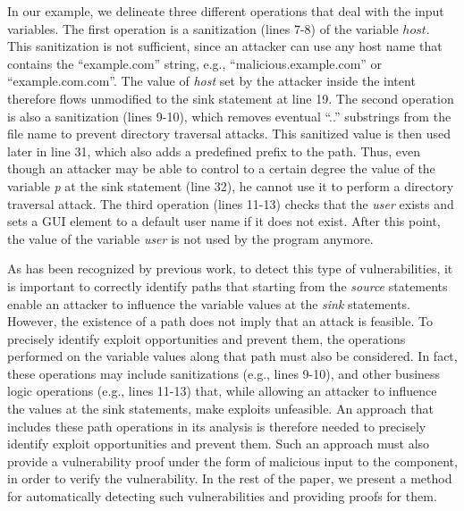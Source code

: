 In our example, we delineate three different operations that deal with the input variables. The first operation is a sanitization (lines 7-8) of the variable $host$. This sanitization is not sufficient, since an attacker can use any host name that contains the ``example.com'' string, e.g., ``malicious.example.com'' or ``example.com.com''. The value of \textit{host} set by the attacker inside the intent therefore flows unmodified to the sink statement at line 19. The second operation is also a sanitization (lines 9-10), which removes eventual ``..'' substrings from the file name to prevent directory traversal attacks. This sanitized value is then used later in line 31, which also adds a predefined prefix to the path. Thus, even though an attacker may be able to control to a certain degree the value of the variable \textit{p} at the sink statement (line 32), he cannot use it to perform a directory traversal attack. The third operation (lines 11-13) checks that the \textit{user} exists and sets a GUI element to a default user name if it does not exist. After this point, the value of the variable \textit{user} is not used by the program anymore. 

As has been recognized by previous work, to detect this type of vulnerabilities, it is important to correctly identify paths that starting from the \textit{source} statements enable an attacker to influence the variable values at the \textit{sink} statements. However, the existence of a path does not imply that an attack is feasible. To precisely identify exploit opportunities and prevent them, the operations performed on the variable values along that path must also be considered. In fact, these operations may include  sanitizations (e.g., lines 9-10), and other business logic operations (e.g., lines 11-13) that, while allowing an attacker to influence the values at the sink statements, make exploits unfeasible. An approach that includes these path operations in its analysis is therefore needed to precisely identify exploit opportunities and prevent them. Such an approach must also provide a vulnerability proof under the form of malicious input to the component, in order to verify the vulnerability. In the rest of the paper, we present a method for automatically detecting such vulnerabilities and providing proofs for them. 



